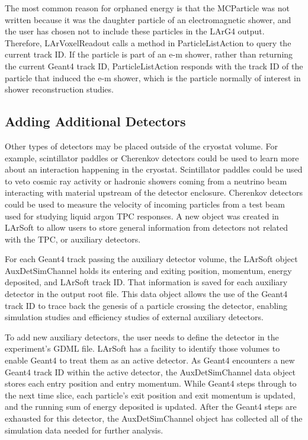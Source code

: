 \documentclass[12pt]{elsarticle}
\newcommand{\larsoft}{LArSoft }
\begin{document}
The most common reason for orphaned energy is that the MCParticle
was not written because it was the daughter
particle of an electromagnetic shower, and the user has chosen not to
include these particles in the LArG4 output. Therefore, LArVoxelReadout calls a method in ParticleListAction to query the current track ID. If the
particle is part of an e-m shower, rather than returning the current
Geant4 track ID, ParticleListAction responds with the
track ID of the particle that induced the e-m shower, which is the
particle normally of interest in shower reconstruction studies.

\subsection{Adding Additional Detectors}
Other types of detectors may be placed outside of the cryostat volume.
For example, scintillator paddles or Cherenkov detectors could be used to learn more about an interaction happening in the cryostat.
Scintillator paddles could be used to veto cosmic ray activity or hadronic showers coming from a neutrino beam interacting with material upstream of the detector enclosure.
Cherenkov detectors could be used to measure the velocity of incoming particles from a test beam used for studying liquid argon TPC responses.
A new object was created in \larsoft to allow users to store general information from detectors not related with the TPC, or auxiliary detectors.

For each Geant4 track passing the auxiliary detector volume, the \larsoft object AuxDetSimChannel holds its entering and exiting position, momentum, energy deposited, and \larsoft track ID.
That information is saved for each auxiliary detector in the output root file.
This data object allows the use of the Geant4 track ID to trace back the genesis of a particle crossing the detector, enabling simulation studies and efficiency studies of external auxiliary detectors.

To add new auxiliary detectors, the user needs to define the detector in the experiment's GDML file.
\larsoft has a facility to identify those volumes to enable Geant4 to treat them as an active detector.
As Geant4 encounters a new Geant4 track ID within the active detector, the AuxDetSimChannel data object stores each entry position and entry momentum.
While Geant4 steps through to the next time slice, each particle's exit position and exit momentum is updated, and the running sum of energy deposited is updated. 
After the Geant4 steps are exhausted for this detector, the AuxDetSimChannel object has collected all of the simulation data needed for further analysis.
\end{document}
